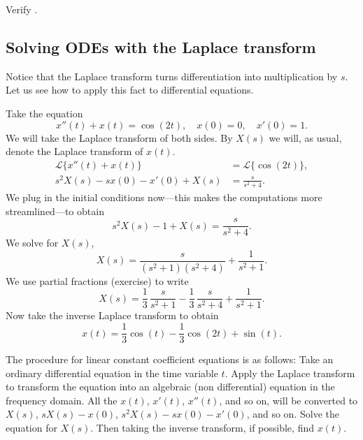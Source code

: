 \begin{exercise}
Verify .
\end{exercise}

\subsection{Solving ODEs with the Laplace transform}

Notice that the Laplace transform turns differentiation into
multiplication by $s$.  Let us see how to apply this fact to differential
equations.

\begin{example}
Take the equation
\begin{equation*}
x''(t) + x(t) = \cos (2t), \quad x(0) = 0, \quad x'(0) = 1 .
\end{equation*}
We will take the Laplace transform of both sides.
By $X(s)$ we will, as usual, denote the Laplace transform of
$x(t)$.
\begin{align*}
\mathcal{L} \bigl\{ x''(t) + x(t) \bigr\} & = \mathcal{L} \bigl\{ \cos (2t) \bigr\} , \\
s^2 X(s) -sx(0)-x'(0) + X(s) & = \frac{s}{s^2 + 4} .
\end{align*}
We plug in the initial conditions now---this makes the computations more
streamlined---to obtain
\begin{equation*}
s^2 X(s) -1 + X(s) = \frac{s}{s^2 + 4} .
\end{equation*}
We solve for $X(s)$,
\begin{equation*}
X(s) = \frac{s}{(s^2+1)(s^2 + 4)} + \frac{1}{s^2+1} .
\end{equation*}
We use partial fractions (exercise) to write
\begin{equation*}
X(s) =\frac{1}{3} \, \frac{s}{s^2+1} - 
\frac{1}{3}\, \frac{s}{s^2+4} + \frac{1}{s^2+1} .
\end{equation*}
Now take the inverse Laplace transform to obtain
\begin{equation*}
x(t) =\frac{1}{3}  \cos (t) -
\frac{1}{3} \cos (2t) + \sin (t) .
\end{equation*}
\end{example}

The procedure for linear constant coefficient equations is as follows:
Take an ordinary differential
equation in the time variable $t$.  Apply the Laplace transform
to transform the equation into an algebraic (non differential) equation in
the frequency domain.  All the $x(t)$, $x'(t)$, $x''(t)$, and so on, will
be converted to $X(s)$, $sX(s) - x(0)$, $s^2X(s) - sx(0) - x'(0)$,
and so on.
Solve the equation for $X(s)$.
Then taking the inverse transform, if possible, find $x(t)$.

